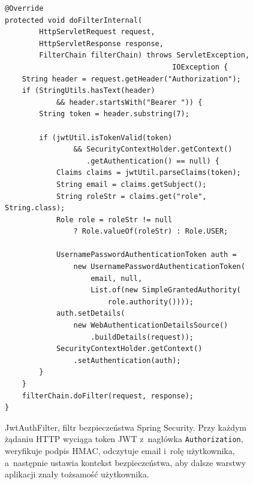 \documentclass[12pt,a4paper]{article}
\begin{document}
\begin{figure}[H]
\begin{lstlisting}[style=java, caption={}, label={}]
@Override
protected void doFilterInternal(
        HttpServletRequest request,
        HttpServletResponse response,
        FilterChain filterChain) throws ServletException,
                                       IOException {
    String header = request.getHeader("Authorization");
    if (StringUtils.hasText(header)
            && header.startsWith("Bearer ")) {
        String token = header.substring(7);

        if (jwtUtil.isTokenValid(token)
                && SecurityContextHolder.getContext()
                   .getAuthentication() == null) {
            Claims claims = jwtUtil.parseClaims(token);
            String email = claims.getSubject();
            String roleStr = claims.get("role", String.class);
            Role role = roleStr != null
                ? Role.valueOf(roleStr) : Role.USER;

            UsernamePasswordAuthenticationToken auth =
                new UsernamePasswordAuthenticationToken(
                    email, null,
                    List.of(new SimpleGrantedAuthority(
                        role.authority())));
            auth.setDetails(
                new WebAuthenticationDetailsSource()
                    .buildDetails(request));
            SecurityContextHolder.getContext()
                .setAuthentication(auth);
        }
    }
    filterChain.doFilter(request, response);
}
\end{lstlisting}
\caption{JwtAuthFilter, filtr bezpieczeństwa Spring Security. Przy każdym żądaniu HTTP wyciąga token JWT z~nagłówka \texttt{Authorization}, weryfikuje podpis HMAC, odczytuje email i~rolę użytkownika, a~następnie ustawia kontekst bezpieczeństwa, aby dalsze warstwy aplikacji znały tożsamość użytkownika.}
\label{fig:jwt-filter}
\end{figure}
\end{document}
